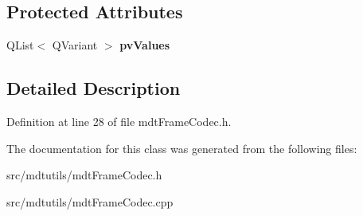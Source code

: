 \subsection*{Protected Attributes}
\begin{DoxyCompactItemize}
\item 
\hypertarget{classmdt_frame_codec_a3e7dc48b11dda3688f48eea2030f0953}{
QList$<$ QVariant $>$ {\bfseries pvValues}}
\label{classmdt_frame_codec_a3e7dc48b11dda3688f48eea2030f0953}

\end{DoxyCompactItemize}


\subsection{Detailed Description}


Definition at line 28 of file mdtFrameCodec.h.



The documentation for this class was generated from the following files:\begin{DoxyCompactItemize}
\item 
src/mdtutils/mdtFrameCodec.h\item 
src/mdtutils/mdtFrameCodec.cpp\end{DoxyCompactItemize}
